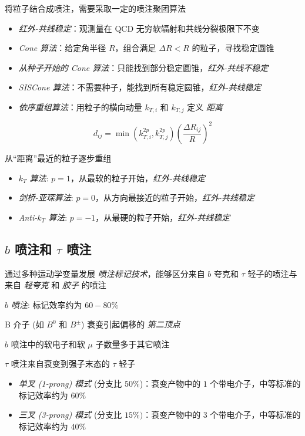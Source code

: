 \documentclass[oneside,a4paper,openany,11pt]{ctexbook}
\begin{document}
将粒子结合成喷注，需要采取一定的喷注聚团算法

\begin{itemize}
    \item \emph{红外-共线稳定}：观测量在 QCD 无穷软辐射和共线分裂极限下不变
    \item \emph{Cone 算法}：给定角半径 $R$，组合满足 $\Delta R < R$ 的粒子，寻找稳定圆锥
    \item \emph{从种子开始的 Cone 算法}：只能找到部分稳定圆锥，\emph{红外-共线不稳定}
    \item \emph{SISCone 算法}：不需要种子，能找到所有稳定圆锥，\emph{红外-共线稳定}
    \item \emph{依序重组算法}：用粒子的横向动量 $k_{T,i}$ 和 $k_{T,j}$ 定义 \emph{距离}
\end{itemize}

\begin{equation}
    d_{ij} = \min \left(k_{T,i}^{2p}, k_{T,j}^{2p}\right) \left(\frac{\Delta R_{ij}}{R}\right)^2
\end{equation}

从“距离”最近的粒子逐步重组

\begin{itemize}
    \item \emph{$k_T$ 算法}: $p=1$，从最软的粒子开始，\emph{红外-共线稳定}
    \item \emph{剑桥-亚琛算法}: $p=0$，从方向最接近的粒子开始，\emph{红外-共线稳定}
    \item \emph{Anti-$k_T$ 算法}: $p=-1$，从最硬的粒子开始，\emph{红外-共线稳定}
\end{itemize}

\subsection{\texorpdfstring{$b$}{b} 喷注和 \texorpdfstring{$\tau$}{tau} 喷注}

通过多种运动学变量发展 \emph{喷注标记技术}，能够区分来自 $b$ 夸克和 $\tau$ 轻子的喷注与来自 \emph{轻夸克} 和 \emph{胶子} 的喷注

\emph{$b$ 喷注}: 标记效率约为 $60-80\%$

B 介子 (如 $B^0$ 和 $B^\pm$) 衰变引起偏移的 \emph{第二顶点}

$b$ 喷注中的软电子和软 $\mu$ 子数量多于其它喷注

$\tau$ 喷注来自衰变到强子末态的 $\tau$ 轻子

\begin{itemize}
    \item \emph{单叉 (1-prong) 模式} (分支比 $50\%$)：衰变产物中的 $1$ 个带电介子，中等标准的标记效率约为 $60\%$
    \item \emph{三叉 (3-prong) 模式} (分支比 $15\%)$：衰变产物中的 $3$ 个带电介子，中等标准的标记效率约为 $40\%$
\end{itemize}
\end{document}
